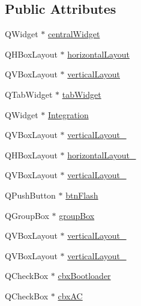 \subsection*{Public Attributes}
\begin{DoxyCompactItemize}
\item 
Q\+Widget $\ast$ \hyperlink{class_ui___remote_hidden_helper_class_a28470fdc0142e3db77eecdb15fbef5af}{central\+Widget}
\item 
Q\+H\+Box\+Layout $\ast$ \hyperlink{class_ui___remote_hidden_helper_class_ad5fcb5626484231afcfe7d8d11b89a6d}{horizontal\+Layout}
\item 
Q\+V\+Box\+Layout $\ast$ \hyperlink{class_ui___remote_hidden_helper_class_af7ac92efd58256c9c12cc70d34642b73}{vertical\+Layout}
\item 
Q\+Tab\+Widget $\ast$ \hyperlink{class_ui___remote_hidden_helper_class_acf56d127ecf6c695cdbdbd5f278c1364}{tab\+Widget}
\item 
Q\+Widget $\ast$ \hyperlink{class_ui___remote_hidden_helper_class_ab2f4e6915ef33b574ce662be194b9180}{Integration}
\item 
Q\+V\+Box\+Layout $\ast$ \hyperlink{class_ui___remote_hidden_helper_class_a47a3e0139bbcce07fe9aa8260b940b3d}{vertical\+Layout\+\_}
\item 
Q\+H\+Box\+Layout $\ast$ \hyperlink{class_ui___remote_hidden_helper_class_a168bb48b75379a664f73ae108a00863f}{horizontal\+Layout\+\_}
\item 
Q\+V\+Box\+Layout $\ast$ \hyperlink{class_ui___remote_hidden_helper_class_aa49b047e44f29fe1c496137febfec9f2}{vertical\+Layout\+\_}
\item 
Q\+Push\+Button $\ast$ \hyperlink{class_ui___remote_hidden_helper_class_ae023c25b1357ab47d7457aa6ce3ea8d5}{btn\+Flash}
\item 
Q\+Group\+Box $\ast$ \hyperlink{class_ui___remote_hidden_helper_class_a1e32f50dddf9deebdf5e9c0acc5b95eb}{group\+Box}
\item 
Q\+V\+Box\+Layout $\ast$ \hyperlink{class_ui___remote_hidden_helper_class_abd56027c9ccdaa206aacad1d7bce3eaf}{vertical\+Layout\+\_}
\item 
Q\+V\+Box\+Layout $\ast$ \hyperlink{class_ui___remote_hidden_helper_class_abccfcb5d74742fed5d64978da9ebc4b8}{vertical\+Layout\+\_}
\item 
Q\+Check\+Box $\ast$ \hyperlink{class_ui___remote_hidden_helper_class_a6caf14f533d691c1245bf2a152a4e742}{cbx\+Bootloader}
\item 
Q\+Check\+Box $\ast$ \hyperlink{class_ui___remote_hidden_helper_class_ad0546671fd7bf35b31518d5dcb721664}{cbx\+AC}

\end{DoxyCompactItemize}

